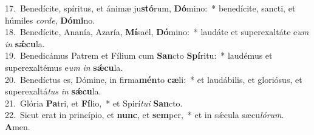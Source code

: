 {17.~}Benedícite, spíritus, et ánimæ ju\textbf{stó}rum, \textbf{Dó}mino:~* benedícite, sancti, et húmiles \textit{cor}\textit{de}, \textbf{Dó}\textbf{mi}no.\\
{18.~}Benedícite, Ananía, Azaría, \textbf{Mí}saël, \textbf{Dó}mino:~* laudáte et superexaltáte e\textit{um} \textit{in} \textbf{sǽ}\textbf{cu}la.\\
{19.~}Benedicámus Patrem et Fílium cum \textbf{San}cto \textbf{Spí}ritu:~* laudémus et superexaltémus e\textit{um} \textit{in} \textbf{sǽ}\textbf{cu}la.\\
{20.~}Benedíctus es, Dómine, in firma\textbf{mén}to \textbf{cæ}li:~* et laudábilis, et gloriósus, et superexaltá\textit{tus} \textit{in} \textbf{sǽ}\textbf{cu}la.\\
{21.~}Glória \textbf{Pa}tri, et \textbf{Fí}lio,~* et Spirí\textit{tu}\textit{i} \textbf{San}cto.\\
{22.~}Sicut erat in princípio, et \textbf{nunc}, et \textbf{sem}per,~* et in sǽcula sæcu\textit{ló}\textit{rum}. \textbf{A}men.\\
